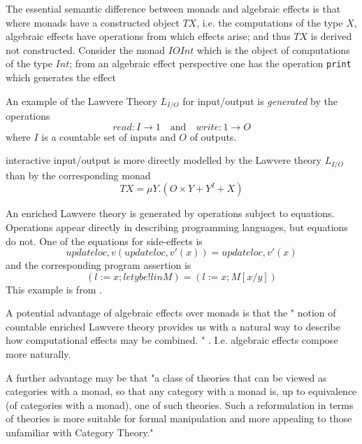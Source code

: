 \documentclass[a4paper,10pt]{article}
\theoremstyle{definition}
\begin{document}
The essential semantic difference between monads and algebraic effects is that
where monads have a constructed object $TX$,
i.e. the computations of the type $X$,
algebraic effects have operations from which effects arise;
and thus $TX$ is derived not constructed.
Consider the monad $IO Int$ which is the object of computations
of the type $Int$;
from an algebraic effect perspective
one has the operation \texttt{print} which generates the effect

An example of the Lawvere Theory $L_{I/O}$ for input/output is \textit{generated} by the operations
\begin{equation}
read : I \rightarrow 1 \quad\textrm{and}\quad write : 1 \rightarrow O
\end{equation}
where $I$ is a countable set of inputs and $O$ of outputs.

\cite{plotkin2001adequacy}
interactive input/output is more directly modelled
by the Lawvere theory $L_{I/O}$ than by the corresponding monad
\begin{equation}
TX = \mu Y.(O \times Y + Y^I + X)
\end{equation}

An enriched Lawvere theory is generated by operations subject to equations.
Operations appear directly in describing programming languages,
but equations do not.
One of the equations for side-effects is
\begin{equation}
    updateloc,v (updateloc,v\prime (x)) = updateloc,v\prime (x)
\end{equation}
and the corresponding program assertion is
\begin{equation}
(l := x;let y be !l in M) = (l := x;M[x/y])
\end{equation}
This example is from \cite{plotkin2001adequacy}.

A potential advantage of algebraic effects over monads is that
the "
notion of countable enriched Lawvere theory
provides us with a natural way to describe
how computational effects may be combined.
"
\cite{plotkin2004computational}.
I.e. algebraic effects compose more naturally.


A further advantage may be that
"a class of theories that can be viewed as categories with a monad,
so that
any category with a monad is, up to equivalence (of categories with a monad), one of such theories.
Such a reformulation in terms of theories is more suitable for formal manipulation and more appealing to those unfamiliar with Category Theory."
\cite{moggi1991notions}
\end{document}
